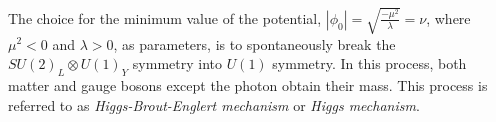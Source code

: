 The choice for the minimum value of the potential, $|\phi_{0}| = \sqrt{\frac{-\mu^{2}}{\lambda}}  = \nu $, where $\mu^{2} < 0 $ and $ \lambda > 0$, as parameters, is to spontaneously break the $SU(2)_{L} \otimes U(1)_{Y}$ symmetry into $U(1)$ symmetry. In this process, both matter and gauge bosons except the photon obtain their mass. This process is referred to as \textit{Higgs-Brout-Englert mechanism} or \textit{Higgs mechanism}.





